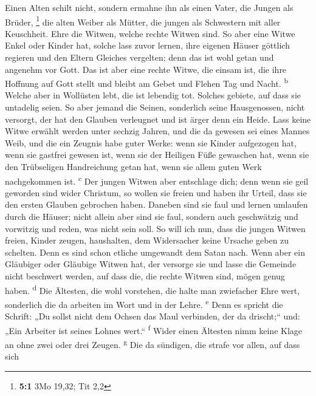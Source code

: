  Einen Alten schilt nicht, sondern ermahne ihn als einen
Vater, die Jungen als Brüder, \footnote{\textbf{5:1} 3Mo 19,32; Tit 2,2}
 die alten Weiber als Mütter, die jungen als Schwestern
mit aller Keuschheit.  Ehre die Witwen, welche rechte
Witwen sind.  So aber eine Witwe Enkel oder Kinder hat,
solche lass zuvor lernen, ihre eigenen Häuser göttlich regieren und den
Eltern Gleiches vergelten; denn das ist wohl getan und angenehm vor
Gott.  Das ist aber eine rechte Witwe, die einsam ist, die
ihre Hoffnung auf Gott stellt und bleibt am Gebet und Flehen Tag und
Nacht. \textsuperscript{b}  Welche aber in Wollüsten lebt,
die ist lebendig tot.  Solches gebiete, auf dass sie
untadelig seien.  So aber jemand die Seinen, sonderlich
seine Hausgenossen, nicht versorgt, der hat den Glauben verleugnet und
ist ärger denn ein Heide.  Lass keine Witwe erwählt werden
unter sechzig Jahren, und die da gewesen sei eines Mannes Weib,
 und die ein Zeugnis habe guter Werke: wenn sie Kinder
aufgezogen hat, wenn sie gastfrei gewesen ist, wenn sie der Heiligen
Füße gewaschen hat, wenn sie den Trübseligen Handreichung getan hat,
wenn sie allem guten Werk nachgekommen ist. \textsuperscript{c}
 Der jungen Witwen aber entschlage dich; denn wenn sie
geil geworden sind wider Christum, so wollen sie freien 
und haben ihr Urteil, dass sie den ersten Glauben gebrochen haben.
 Daneben sind sie faul und lernen umlaufen durch die
Häuser; nicht allein aber sind sie faul, sondern auch geschwätzig und
vorwitzig und reden, was nicht sein soll.  So will ich
nun, dass die jungen Witwen freien, Kinder zeugen, haushalten, dem
Widersacher keine Ursache geben zu schelten.  Denn es
sind schon etliche umgewandt dem Satan nach.  Wenn aber
ein Gläubiger oder Gläubige Witwen hat, der versorge sie und lasse die
Gemeinde nicht beschwert werden, auf dass die, die rechte Witwen sind,
mögen genug haben. \textsuperscript{d}  Die Ältesten, die
wohl vorstehen, die halte man zwiefacher Ehre wert, sonderlich die da
arbeiten im Wort und in der Lehre. \textsuperscript{e} 
Denn es spricht die Schrift: „Du sollst nicht dem Ochsen das Maul
verbinden, der da drischt;`` und: „Ein Arbeiter ist seines Lohnes
wert.`` \textsuperscript{f}  Wider einen Ältesten nimm
keine Klage an ohne zwei oder drei Zeugen. \textsuperscript{g}
 Die da sündigen, die strafe vor allen, auf dass sich
